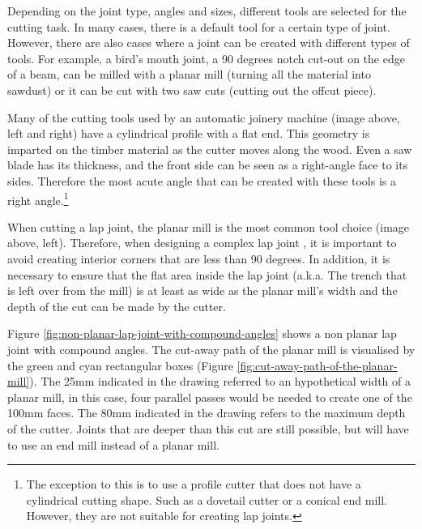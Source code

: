 Depending on the joint type, angles and sizes, different tools are selected for the cutting task. In many cases, there is a default tool for a certain type of joint. However, there are also cases where a joint can be created with different types of tools. For example, a bird's mouth joint, a 90 degrees notch cut-out on the edge of a beam, can be milled with a planar mill (turning all the material into sawdust) or it can be cut with two saw cuts (cutting out the offcut piece).

Many of the cutting tools used by an automatic joinery machine (image above, left and right) have a cylindrical profile with a flat end. This geometry is imparted on the timber material as the cutter moves along the wood. Even a saw blade has its thickness, and the front side can be seen as a right-angle face to its sides. Therefore the most acute angle that can be created with these tools is a right angle.\footnote{The exception to this is to use a profile cutter that does not have a cylindrical cutting shape. Such as a dovetail cutter or a conical end mill. However, they are not suitable for creating lap joints.}

When cutting a lap joint, the planar mill is the most common tool choice (image above, left). Therefore, when designing a complex lap joint , it is important to avoid creating interior corners that are less than 90 degrees. In addition, it is necessary to ensure that the flat area inside the lap joint (a.k.a. The trench that is left over from the mill) is at least as wide as the planar mill’s width and the depth of the cut can be made by the cutter.

Figure \ref{fig:non-planar-lap-joint-with-compound-angles} shows a non planar lap joint with compound angles. The cut-away path of the planar mill is visualised by the green and cyan rectangular boxes (Figure \ref{fig:cut-away-path-of-the-planar-mill}). The 25mm indicated in the drawing referred to an hypothetical width of a planar mill, in this case, four parallel passes would be needed to create one of the 100mm faces. The 80mm indicated in the drawing refers to the maximum depth of the cutter. Joints that are deeper than this cut are still possible, but will have to use an end mill instead of a planar mill.


